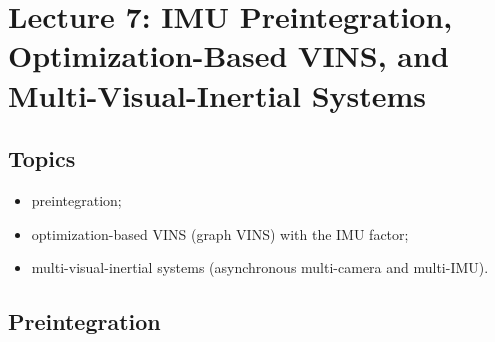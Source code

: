 \section{Lecture 7: IMU Preintegration, Optimization-Based VINS, and Multi-Visual-Inertial Systems}
\label{sec:lecture07}

\subsection{Topics}
\begin{itemize}[itemsep=0.3em]
\item preintegration;
\item optimization-based VINS (graph VINS) with the IMU factor;
\item multi-visual-inertial systems (asynchronous multi-camera and multi-IMU).
\end{itemize}


\setlength{\arraycolsep}{3.5pt}

\subsection{Preintegration}
\label{sec:lec07-preint}

